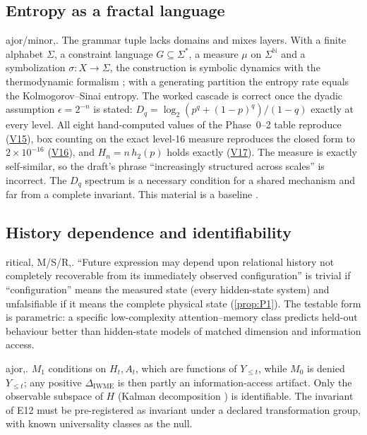 \documentclass[11pt]{article}
\makeatletter
\theoremstyle{definition}
\theoremstyle{remark}
\newcommand{\V}[1]{\hyperref[app:verify]{\textsf{#1}}}
\def\finding@split#1,#2\@nil{\textbf{#1}\if\relax\detokenize{#2}\relax\else\ (\ignorespaces\finding@strip#2\@nil)\fi}
\def\finding@strip#1,\@nil{#1}
\newenvironment{finding}[1][]{\par\smallskip\noindent\finding@split#1,\@nil.\enspace\ignorespaces}{\par\smallskip}
\makeatother
\begin{document}
\subsection{Entropy as a fractal language}
\begin{finding}[F14--F16, major/minor] The grammar tuple lacks domains and mixes layers. With a finite alphabet $\Sigma$, a constraint language $G\subseteq\Sigma^*$, a measure $\mu$ on $\Sigma^{\mathbb N}$ and a symbolization $\sigma:X\to\Sigma$, the construction is symbolic dynamics with the thermodynamic formalism \cite{Ruelle1978,LindMarcus1995,Halsey1986}; with a generating partition the entropy rate equals the Kolmogorov--Sinai entropy. The worked cascade is correct once the dyadic assumption $\epsilon=2^{-n}$ is stated: $D_q=\log_2(p^q+(1-p)^q)/(1-q)$ exactly at every level. All eight hand-computed values of the Phase~0--2 table reproduce (\V{V15}), box counting on the exact level-16 measure reproduces the closed form to $2\times10^{-16}$ (\V{V16}), and $H_n=n\,h_2(p)$ holds exactly (\V{V17}). The measure is exactly self-similar, so the draft's phrase ``increasingly structured across scales'' is incorrect. The $D_q$ spectrum is a necessary condition for a shared mechanism and far from a complete invariant. This material is a baseline \cite{Mandelbrot1974,Hentschel1983,Renyi1961}.
\end{finding}

\subsection{History dependence and identifiability}
\begin{finding}[F18, critical, M/S/R] ``Future expression may depend upon relational history not completely recoverable from its immediately observed configuration'' is trivial if ``configuration'' means the measured state (every hidden-state system) and unfalsifiable if it means the complete physical state (\cref{prop:P1}). The testable form is parametric: a specific low-complexity attention--memory class predicts held-out behaviour better than hidden-state models of matched dimension and information access.
\end{finding}

\begin{finding}[F19--F21, major] $M_1$ conditions on $H_t,A_t$, which are functions of $Y_{\le t}$, while $M_0$ is denied $Y_{\le t}$; any positive $\Delta_{\mathrm{IWME}}$ is then partly an information-access artifact. Only the observable subspace of $H$ (Kalman decomposition \cite{Kalman1960}) is identifiable. The invariant of E12 must be pre-registered as invariant under a declared transformation group, with known universality classes \cite{Turing1952,CrossHohenberg1993} as the null.
\end{finding}
\end{document}
